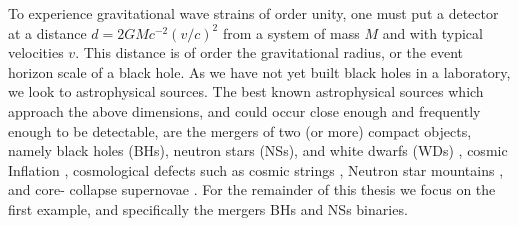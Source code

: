 To experience gravitational wave strains of order unity, one must put a
detector at a distance $d= 2GMc^{-2} (v/c)^2$ from a system of mass $M$ and
with typical velocities $v$. This distance is of order the gravitational
radius, or the event horizon scale of a black hole. As we have not yet built
black holes in a laboratory, we look to astrophysical sources. The best known
astrophysical sources which approach the above dimensions, and could occur
close enough and frequently enough to be detectable, are the mergers of two
(or more) compact objects, namely black holes (BHs), neutron stars (NSs), and
white dwarfs (WDs) \citep{}, cosmic Inflation \citep{}, cosmological defects
such as cosmic strings \citep{}, Neutron star mountains \citep{}, and core-
collapse supernovae \citep{}. For the remainder of this thesis we focus on the
first example, and specifically the mergers BHs and NSs binaries.



%


